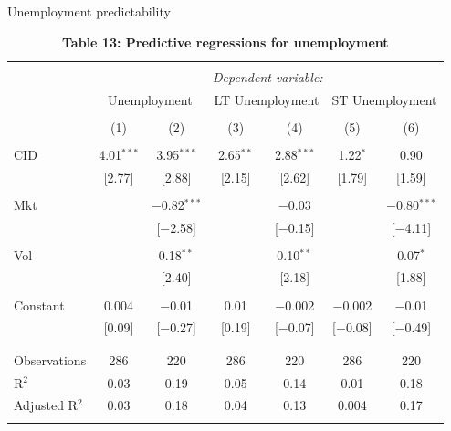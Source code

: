 \documentclass{beamer}
\begin{document}
\scriptsize
{\renewcommand{\arraystretch}{0.96}
\begin{frame}{Unemployment predictability}
\begin{table}[!htbp] \centering 
  \caption*{\textbf{Table 13: Predictive regressions for unemployment}} 
  \vspace{-0.2cm}
\begin{tabular}{@{\extracolsep{5pt}}lcccccc} 
\\[-1.8ex]\hline 
\hline \\[-1.8ex] 
 & \multicolumn{6}{c}{\textit{Dependent variable:}} \\ 
\cline{2-7} 
 & \multicolumn{2}{c}{Unemployment} & \multicolumn{2}{c}{LT Unemployment} & \multicolumn{2}{c}{ST Unemployment} \\ 
\\[-1.8ex] & (1) & (2) & (3) & (4) & (5) & (6)\\ 
\hline \\[-1.8ex] 
 CID & 4.01$^{***}$ & 3.95$^{***}$ & 2.65$^{**}$ & 2.88$^{***}$ & 1.22$^{*}$ & 0.90 \\ 
  & [2.77] & [2.88] & [2.15] & [2.62] & [1.79] & [1.59] \\ 
  & & & & & & \\ 
 Mkt &  & $-$0.82$^{***}$ &  & $-$0.03 &  & $-$0.80$^{***}$ \\ 
  &  & [$-$2.58] &  & [$-$0.15] &  & [$-$4.11] \\ 
  & & & & & & \\ 
 Vol &  & 0.18$^{**}$ &  & 0.10$^{**}$ &  & 0.07$^{*}$ \\ 
  &  & [2.40] &  & [2.18] &  & [1.88] \\ 
  & & & & & & \\ 
 Constant & 0.004 & $-$0.01 & 0.01 & $-$0.002 & $-$0.002 & $-$0.01 \\ 
  & [0.09] & [$-$0.27] & [0.19] & [$-$0.07] & [$-$0.08] & [$-$0.49] \\ 
  & & & & & & \\ 
\hline \\[-1.8ex] 
Observations & 286 & 220 & 286 & 220 & 286 & 220 \\ 
R$^{2}$ & 0.03 & 0.19 & 0.05 & 0.14 & 0.01 & 0.18 \\ 
Adjusted R$^{2}$ & 0.03 & 0.18 & 0.04 & 0.13 & 0.004 & 0.17 \\ 
\hline 
\hline \\[-1.8ex] 
\end{tabular} 
\end{table}
\end{frame}
}
\end{document}
